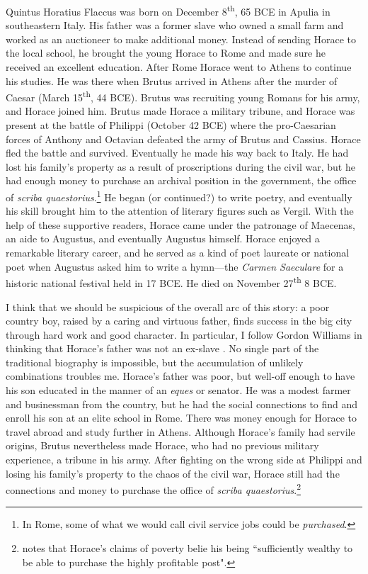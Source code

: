 Quintus Horatius Flaccus was born on December 8\textsuperscript{th}, 65 BCE in Apulia in southeastern Italy.  His father was a former slave who owned a small farm and worked as an auctioneer to make additional money.  Instead of sending Horace to the local school, he brought the young Horace to Rome and made sure he received an excellent education.  After Rome Horace went to Athens to continue his studies.  He was there when Brutus arrived in Athens after the murder of Caesar (March 15\textsuperscript{th}, 44 BCE).  Brutus was recruiting young Romans for his army, and Horace joined him.  Brutus made Horace a military tribune, and Horace was present at the battle of Philippi (October 42 BCE) where the pro-Caesarian forces of Anthony and Octavian defeated the army of Brutus and Cassius.  Horace fled the battle and survived.  Eventually he made his way back to Italy.  He had lost his family's property as a result of proscriptions during the civil war, but he had enough money to purchase an archival position in the government, the office of \textit{scriba quaestorius}.\footnote{In Rome, some of what we would call civil service jobs could be \textit{purchased}.}  He began (or continued?) to write poetry, and eventually his skill brought him to the attention of literary figures such as Vergil.  With the help of these supportive readers, Horace came under the patronage of Maecenas, an aide to Augustus, and eventually Augustus himself.  Horace enjoyed a remarkable literary career, and he served as a kind of poet laureate or national poet when Augustus asked him to write a hymn---the \textit{Carmen Saeculare} for a historic national festival held in 17 BCE.  He died on November 27\textsuperscript{th} 8 BCE.

I think that we should be suspicious of the overall arc of this story: a poor country boy, raised by a caring and virtuous father, finds success in the big city through hard work and good character.  In particular, I follow Gordon Williams in thinking that Horace's father was not an ex-slave \citep{williams1995}.  No single part of the traditional biography is impossible, but the accumulation of unlikely combinations troubles me.  Horace's father was poor, but well-off enough to have his son educated in the manner of an \textit{eques} or senator.  He was a modest farmer and businessman from the country, but he had the social connections to find and enroll his son at an elite school in Rome.  There was money enough for Horace to travel abroad and study further in Athens.  Although Horace's family had servile origins, Brutus nevertheless made Horace, who had no previous military experience, a tribune in his army.  After fighting on the wrong side at Philippi and losing his family's property to the chaos of the civil war, Horace still had the connections and money to purchase the office of \textit{scriba quaestorius}.\footnote{\citet[104]{williams1995} notes that Horace's claims of poverty belie his being ``sufficiently wealthy to be able to purchase the highly profitable post".}


